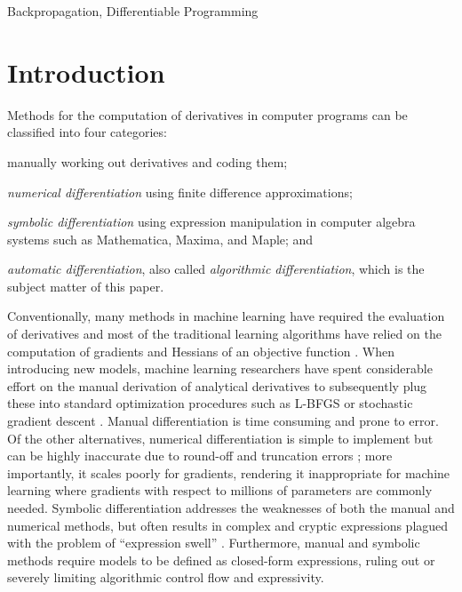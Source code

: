 \documentclass[twoside,11pt]{article}
\begin{document}
\begin{keywords}
  Backpropagation, Differentiable Programming
\end{keywords}

\section{Introduction}

Methods for the computation of derivatives in computer programs can be classified into four categories:
\begin{inparaenum}[(1)]
    \item manually working out derivatives and coding them;
    \item \emph{numerical differentiation} using finite difference approximations;
    \item \emph{symbolic differentiation} using expression manipulation in computer algebra systems such as Mathematica, Maxima, and Maple; and
    \item \emph{automatic differentiation}, also called \emph{algorithmic differentiation}, which is the subject matter of this paper.
\end{inparaenum}

Conventionally, many methods in machine learning have required the evaluation of derivatives and most of the traditional learning algorithms have relied on the computation of gradients and Hessians of an objective function \citep{Sra2011}. When introducing new models, machine learning researchers have spent considerable effort on the manual derivation of analytical derivatives to subsequently plug these into standard optimization procedures such as L-BFGS \citep{Zhu1997} or stochastic gradient descent \citep{Bottou1998}. Manual differentiation is time consuming and prone to error. Of the other alternatives, numerical differentiation is simple to implement but can be highly inaccurate due to round-off and truncation errors \citep{Jerrell1997}; more importantly, it scales poorly for gradients, rendering it inappropriate for machine learning where gradients with respect to millions of parameters are commonly needed. Symbolic differentiation addresses the weaknesses of both the manual and numerical methods, but often results in complex and cryptic expressions plagued with the problem of ``expression swell'' \citep{Corliss1988}. Furthermore, manual and symbolic methods require models to be defined as closed-form expressions, ruling out or severely limiting algorithmic control flow and expressivity.
\end{document}
